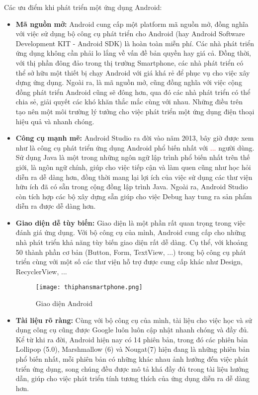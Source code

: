 \documentclass[../thesis.tex]{subfiles}
\begin{document}
	Các ưu điểm khi phát triển một ứng dụng Android:
	\begin{itemize}
		\item \textbf{Mã nguồn mở:} Android cung cấp một platform mã nguồn mở, đồng nghĩa với việc sử dụng bộ công cụ phát triển cho Android (hay Android Software Development KIT - Android SDK) là hoàn toàn miễn phí. Các nhà phát triển ứng dụng không cần phải lo lắng về vấn đề bản quyền hay giá cả. Đồng thời, với thị phần đông đảo trong thị trường Smartphone, các nhà phát triển có thể sở hữu một thiết bị chạy Android với giá khá rẻ để phục vụ cho việc xây dựng ứng dụng. Ngoài ra, là mã nguồn mở, cũng đồng nghĩa với việc cộng đồng phát triển Android cũng sẽ đông hơn, qua đó các nhà phát triển có thể chia sẻ, giải quyết các khó khăn thắc mắc cùng với nhau. Những điều trên tạo nên một môi trường lý tưởng cho việc phát triển một ứng dụng điện thoại hiệu quả và nhanh chóng.
		
		\item \textbf{Công cụ mạnh mẽ:} Android Studio ra đời vào năm 2013, bây giờ được xem như là công cụ phát triển ứng dụng Android phổ biến nhất với \textcolor{red}{...} người dùng. Sử dụng Java là một trong những ngôn ngữ lập trình phổ biến nhất trên thế giới, là ngôn ngữ chính, giúp cho việc tiếp cận và làm quen cũng như học hỏi diễn ra dễ dàng hơn, đồng thời mang lại lợi ích của việc sử dụng các thư viện hữu ích đã có sẵn trong cộng đồng lập trình Java. Ngoài ra, Android Studio còn tích hợp các bộ xây dựng sẵn giúp cho việc Debug hay tung ra sản phẩm diễn ra được dễ dàng hơn.
		
		\item \textbf{Giao diện dễ tùy biến: } Giao diện là một phần rất quan trọng trong việc đánh giá ứng dụng. Với bộ công cụ của mình, Android cung cấp cho những nhà phát triển khả năng tùy biến giao diện rất dễ dàng. Cụ thể, với khoảng 50 thành phần cơ bản (Button, Form, TextView, ...) trong bộ công cụ phát triển cùng với một số các thư viện hỗ trợ được cung cấp khác như Design, RecyclerView, ...
		\begin{figure}[ht!]
			\centering
			\texttt{[image: thiphansmartphone.png]}
			\caption{Giao diện Android}
			\label{fig:minhhoa_giaodien}
		\end{figure}
		\item \textbf{Tài liệu rõ ràng: } Cùng với bộ công cụ của mình, tài liệu cho việc học và sử dụng công cụ cũng được Google luôn luôn cập nhật nhanh chóng và đầy đủ. Kể từ khi ra đời, Android hiện nay có 14 phiên bản, trong đó các phiên bản Lollipop (5.0), Marshmallow (6) và Nougat(7) hiện đang là những phiên bản phổ biến nhất, mỗi phiên bản có những khác nhau ảnh hưởng đến việc phát triển ứng dụng, song chúng đều được mô tả khá đầy đủ trong tài liệu hướng dẫn, giúp cho việc phát triển tính tương thích của ứng dụng diễn ra dễ dàng hơn.
	\end{itemize}
\end{document}
